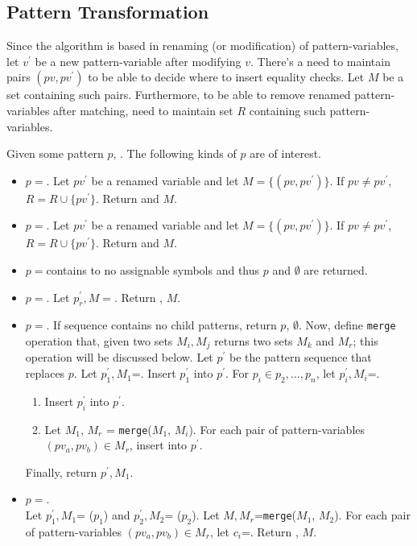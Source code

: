 \subsection{Pattern Transformation}
Since the algorithm is based in renaming (or modification) of pattern-variables, let $v^{\prime}$ be a new pattern-variable after modifying $v$. There's a need to maintain pairs $(pv, pv^{\prime})$ to be able to decide where to insert equality checks. Let $M$ be a set containing such pairs. Furthermore, to be able to remove renamed pattern-variables after matching, need to maintain set $R$ containing such pattern-variables.

Given some pattern $p$, . The following kinds of $p$ are of interest.
\begin{itemize}
\item $p=$\BuiltInPattern. Let $pv^{\prime}$ be a renamed variable and let $M=\{(pv, pv^{\prime})\}$. If $pv \neq pv^{\prime}$, $R=R \cup \{pv^{\prime}\}$. Return \BuiltInPattern[$tag$][$pv^{\prime}$][false] and $M$.
\item $p=$\NonTerminal. Let $pv^{\prime}$ be a renamed variable and let $M=\{(pv, pv^{\prime})\}$. If $pv \neq pv^{\prime}$, $R=R \cup \{pv^{\prime}\}$. Return \NonTerminal[$nt$][$pv^{\prime}$][false] and $M$.
\item $p=$\LiteralPattern contains to no assignable symbols and thus $p$ and $\emptyset$ are returned.
\item $p=$\PatternRepeat. Let $p_r^{\prime}, M =$. Return \PatternRepeat[$p_r^{\prime}$], $M$.
\item
$p=$\PatternSequence. If sequence contains no child patterns, return $p$, $\emptyset$. Now, define \texttt{merge} operation that, given two sets $M_i, M_j$ returns two sets $M_k$ and $M_r$; this operation will be discussed below. 
Let $p^{\prime}$ be the pattern sequence that replaces $p$.
Let $p_1^{\prime}, M_1$=. Insert $p_1^{\prime}$ into $p^{\prime}$. For $p_i \in p_2, ..., p_n$, let $p_i^{\prime}, M_i$=.
	\begin{enumerate}
	\item 
	Insert $p_i^{\prime}$ into $p^{\prime}$.
	\item
	Let $M_1$, $M_r$ = \texttt{merge}($M_1$, $M_i$). For each pair of pattern-variables $(pv_a, pv_b) \in M_r$, insert \PatternCheckConstraint[$pv_a$][$pv_b$][false] into $p^{\prime}$.
	\end{enumerate}
Finally, return $p^{\prime}, M_1$.

\item
$p=$\PatternInHole.\\ Let $p_1^{\prime}, M_1$= \Visit($p_1$) and $p_2^{\prime}, M_2$= \Visit($p_2$). Let $M, M_r$=\texttt{merge}($M_1$, $M_2$). For each pair of pattern-variables $(pv_a, pv_b) \in M_r$, let $c_i$=\PatternCheckConstraint[$pv_a$][$pv_b$][false]. Return \PatternInHole[$p_1^{\prime}$][$p_2^{\prime}$][$c_1$][$c_n$][false], $M$.
\end{itemize}

